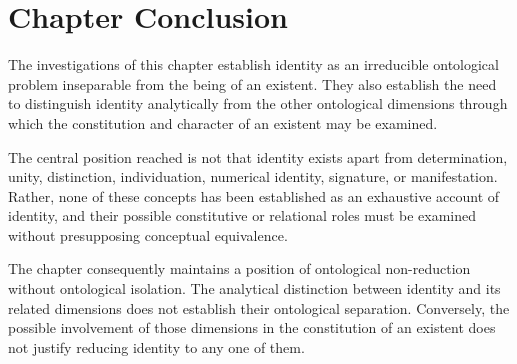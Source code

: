 











\section*{Chapter Conclusion}

The investigations of this chapter establish identity
as an irreducible ontological problem inseparable from
the being of an existent. They also establish the need
to distinguish identity analytically from the other
ontological dimensions through which the constitution
and character of an existent may be examined.

The central position reached is not that identity exists
apart from determination, unity, distinction, individuation,
numerical identity, signature, or manifestation. Rather,
none of these concepts has been established as an
exhaustive account of identity, and their possible
constitutive or relational roles must be examined
without presupposing conceptual equivalence.

The chapter consequently maintains a position of
ontological non-reduction without ontological isolation.
The analytical distinction between identity and its
related dimensions does not establish their ontological
separation. Conversely, the possible involvement of
those dimensions in the constitution of an existent
does not justify reducing identity to any one of them.

